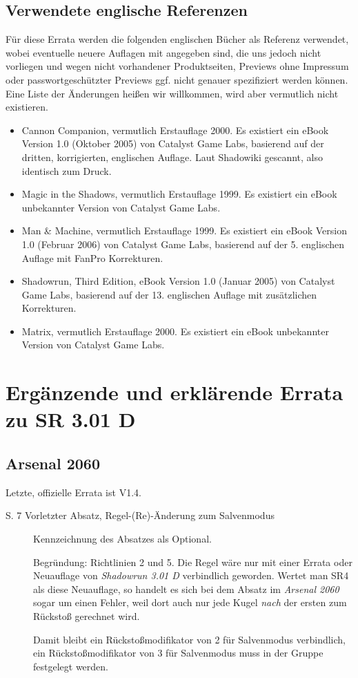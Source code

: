 \documentclass[a4paper]{scrartcl}
\newcommand{\errata}[1]{Letzte, offizielle Errata ist V#1.}
\begin{document}
\subsection{Verwendete englische Referenzen}
Für diese Errata werden die folgenden englischen Bücher als Referenz verwendet, wobei eventuelle neuere Auflagen mit angegeben sind, die uns jedoch nicht vorliegen und wegen nicht vorhandener Produktseiten, Previews ohne Impressum oder passwortgeschützter Previews ggf. nicht genauer spezifiziert werden können.
Eine Liste der Änderungen heißen wir willkommen, wird aber vermutlich nicht existieren.
\begin{itemize}
 \item Cannon Companion, vermutlich Erstauflage 2000. Es existiert ein eBook Version 1.0 (Oktober 2005) von Catalyst Game Labs, basierend auf der dritten, korrigierten, englischen Auflage. Laut Shadowiki gescannt, also identisch zum Druck.
 \item Magic in the Shadows, vermutlich Erstauflage 1999. Es existiert ein eBook unbekannter Version von Catalyst Game Labs.
 \item Man \& Machine, vermutlich Erstauflage 1999. Es existiert ein eBook Version 1.0 (Februar 2006) von Catalyst Game Labs, basierend auf der 5. englischen Auflage mit FanPro Korrekturen.
 \item Shadowrun, Third Edition, eBook Version 1.0 (Januar 2005) von Catalyst Game Labs, basierend auf der 13. englischen Auflage mit zusätzlichen Korrekturen.
 \item Matrix, vermutlich Erstauflage 2000. Es existiert ein eBook unbekannter Version von Catalyst Game Labs.
\end{itemize}

\section{Ergänzende und erklärende Errata zu SR 3.01 D}
\subsection{Arsenal 2060}
\errata{1.4}
\begin{description}
 \item[S. 7 Vorletzter Absatz, Regel-(Re)-Änderung zum Salvenmodus] Kennzeichnung des Absatzes als Optional.
 
 Begründung: Richtlinien 2 und 5. Die Regel wäre nur mit einer Errata oder Neuauflage von \textit{Shadowrun 3.01 D} verbindlich geworden. Wertet man SR4 als diese Neuauflage, so handelt es sich bei dem Absatz im \textit{Arsenal 2060} sogar um einen Fehler, weil dort auch nur jede Kugel \textit{nach} der ersten zum Rückstoß gerechnet wird.
 
 Damit bleibt ein Rückstoßmodifikator von 2 für Salvenmodus verbindlich, ein Rückstoßmodifikator von 3 für Salvenmodus muss in der Gruppe festgelegt werden.
\end{description}
\end{document}
